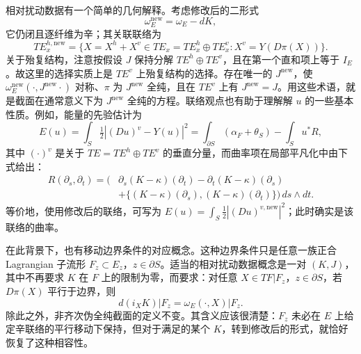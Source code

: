 \begin{note}\label{st:17.1}
相对扰动数据有一个简单的几何解释。考虑修改后的二形式
\begin{equation}\label{eq:17.3}
\omega_E^{\mathrm{new}}=\omega_E-dK,
\end{equation}
它仍闭且逐纤维为辛；其关联联络为
\begin{equation}\label{eq:17.4}
TE_x^{h,\mathrm{new}}=\{X=X^h+X^v\in TE_x=TE_x^h\oplus TE_x^v:
X^v=Y(D\pi(X))\}.
\end{equation}
关于殆复结构，注意按假设 $J$ 保持分解 $TE^h\oplus TE^v$，且在第一个直和项上等于 $I_E$。故这里的选择实质上是 $TE^v$ 上殆复结构的选择。存在唯一的 $J^{\mathrm{new}}$，使 $\omega_E^{\mathrm{new}}(\cdot,J^{\mathrm{new}}\cdot)$ 对称、$\pi$ 为 $J^{\mathrm{new}}$ 全纯，且在 $TE^v$ 上有 $J^{\mathrm{new}}=J$。用这些术语，就是截面在通常意义下为 $J^{\mathrm{new}}$ 全纯的方程。联络观点也有助于理解解 $u$ 的一些基本性质。例如，能量的先验估计为
\[
E(u)=\int_S\tfrac12|(Du)^v-Y(u)|^2
=\int_{\partial S}(\alpha_F+\theta_S)-\int_Su^*R,
\]
其中 $(\cdot)^v$ 是关于 $TE=TE^h\oplus TE^v$ 的垂直分量，而曲率项在局部平凡化中由下式给出：
\begin{equation}\label{eq:17.5}
\begin{aligned}
R(\partial_s,\partial_t)=\bigl(&\partial_s(K-\kappa)(\partial_t)-\partial_t(K-\kappa)(\partial_s)\\
&+\{(K-\kappa)(\partial_s),(K-\kappa)(\partial_t)\}\bigr)\,ds\wedge dt.
\end{aligned}
\end{equation}
等价地，使用修改后的联络，可写为 $E(u)=\int_S\tfrac12|(Du)^{v,\mathrm{new}}|^2$；此时确实是该联络的曲率。
\end{note}

\begin{note}\label{st:17.2}
在此背景下，也有移动边界条件的对应概念。这种边界条件只是任意一族正合 Lagrangian 子流形 $F_z\subset E_z$，$z\in\partial S$。适当的相对扰动数据概念是一对 $(K,J)$，其中不再要求 $K$ 在 $F$ 上的限制为零，而要求：对任意 $X\in TF|F_z$，$z\in\partial S$，若 $D\pi(X)$ 平行于边界，则
\begin{equation}\label{eq:17.6}
d(i_XK)|F_z=\omega_E(\cdot,X)|F_z.
\end{equation}
除此之外，非齐次伪全纯截面的定义不变。其含义应该很清楚：$F_z$ 未必在 $E$ 上给定辛联络的平行移动下保持，但对于满足的某个 $K$，转到修改后的形式，就恰好恢复了这种相容性。
\end{note}

